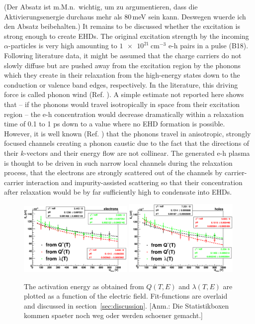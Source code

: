 (Der Absatz ist m.M.n.\ wichtig, um zu argumentieren, dass die Aktivierungsenergie durchaus mehr als 80\,meV sein kann. Deswegen wuerde ich den Absatz beibehalten.)
It remains to be discussed whether the excitation is strong enough to create EHDs. 
The original excitation strength by the incoming $\alpha$-particles is very high amounting to $\SI{1e21}{\cm^{-3}}$ e-h pairs in a pulse {\color{red}(B18)}. 
Following literature data, it might be assumed that the charge carriers do not slowly diffuse but are pushed away from the excitation region by the phonons which they create in their relaxation
 from the high-energy states down to the conduction or valence band edges, respectively. 
In the literature, this driving force is called phonon wind (Ref.   ). 
A simple estimate not reported here shows that – if the phonons would travel isotropically in space from their excitation region
 -- the e-h concentration would decrease dramatically within a relaxation time of 0.1 to 1 ps down to a value where no EHD formation is possible. 
However, it is well known (Ref.        ) that the phonons travel in anisotropic,
 strongly focused channels creating a phonon caustic due to the fact that the directions of their $k$-vectors and their energy flow are not collinear. 
The generated e-h plasma is thought to be driven in such narrow local channels during the relaxation process, that the electrons are strongly scattered out of the channels by carrier-carrier interaction
 and impurity-assisted scattering so that their concentration after relaxation would be by far sufficiently high to condensate into EHDs.

\begin{figure}[tb]
 \centering
 \includegraphics[trim=0 0 0 0, width=0.49\textwidth]{figures/EaU_e.eps}
 \includegraphics[trim=0 0 0 0, width=0.49\textwidth]{figures/EaU_h.eps}
 \caption{The activation energy as obtained from $Q(T,E)$ and $\lambda(T,E)$ are plotted as a function of the electric field. 
 Fit-functions are overlaid and discussed in section~\ref{sec:discussion}. [Anm.: Die Statistikboxen kommen spaeter noch weg oder werden schoener gemacht.]}
 \label{fig:Eafield}
\end{figure} 

